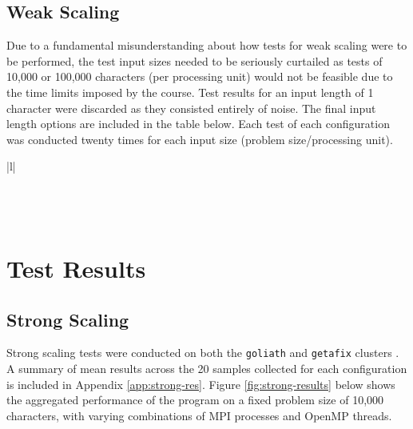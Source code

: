\subsection{Weak Scaling}
Due to a fundamental misunderstanding about how tests for weak scaling were to be performed, the test input sizes needed to be seriously curtailed as tests of 10,000 or 100,000 characters (per processing unit) would not be feasible due to the time limits imposed by the course. Test results for an input length of 1 character were discarded as they consisted entirely of noise. The final input length options are included in the table below. Each test of each configuration was conducted twenty times for each input size (problem size/processing unit). 

\begin{table}[H]
\centering
\begin{tabular}{|l|}
\hline
{} \\  \\  \\  \\ \hline
\end{tabular}
\caption{Actual Weak Scaling Input Magnitudes}
\label{tab:real-weak}
\end{table}


\section{Test Results}
\subsection{Strong Scaling}

Strong scaling tests were conducted on both the \lstinline{goliath} and \lstinline{getafix} clusters . A summary of mean results across the 20 samples collected for each configuration is included in Appendix \ref{app:strong-res}. Figure \ref{fig:strong-results} below shows the aggregated performance of the program on a fixed problem size of 10,000 characters, with varying combinations of MPI processes and OpenMP threads.

